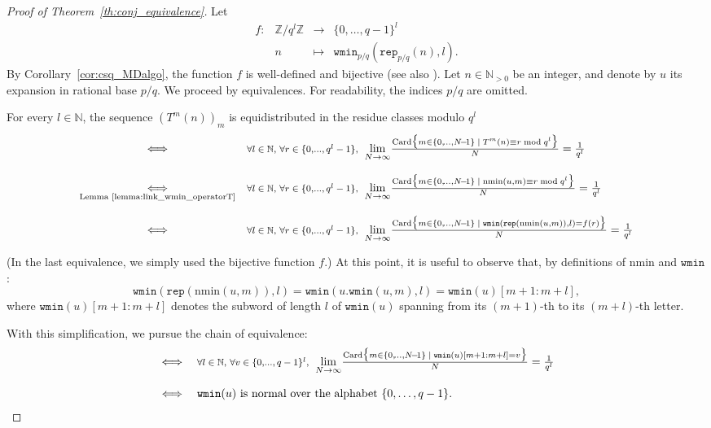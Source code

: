 \documentclass{template_arxiv}
\numberwithin{equation}{section}
\newcommand{\N}{\mathbb N}
\newcommand{\wmin}{\mathtt{wmin}}
\newcommand{\nmin}{\mathrm{nmin}}
\newcommand{\rep}{\mathtt{rep}}
\newcommand{\card}{\mathrm{Card}}
\begin{document}
\begin{proof}[Proof of Theorem~\ref{th:conj_equivalence}] Let
	\[ \begin{array}{llll}
	f : & \mathbb{Z}/q^l\mathbb{Z} & \longrightarrow & \{0,\dots,q-1\}^l \\
	& n & \longmapsto & \wmin_{p/q}(\rep_{p/q}(n),l).
	\end{array}\]
By Corollary~\ref{cor:csq_MDalgo}, the function $f$ is well-defined and bijective (see also \cite[Lemme~4.14]{Mar16}).
	Let $n \in \N_{>0}$ be an integer, and denote by $u$ its expansion in rational base $p/q$.
	We proceed by equivalences. For readability, the indices $p/q$ are omitted.
	
	
	\bigskip
	
	\noindent For every $l\in \N$, the sequence $(T^m(n))_m$ is equidistributed in the residue classes modulo $q^l$ 
	\small
	\[
	\begin{array}{cl}
	\iff & \text{\footnotesize $\forall l\in\N,$ $\forall r \in \{0,\!...,q^l-1\}$, \small } \; \underset{N\to\infty}{\lim}  \frac{\card \big\{m\in \{0,\!...,N\!-\!1\} \;|\; T^m(n) \equiv r \bmod q^l\big\}}{N} = \frac{1}{q^l}\\ \\
	\underset{\text{Lemma~\ref{lemma:link_wmin_operatorT}}}{\iff} & \text{\footnotesize $\forall l\in\N,$ $\forall r \in \{0,\!...,q^l-1\}$, \small } \;\underset{N\to\infty}{\lim} \frac{\card \big\{m\in \{0,\!...,N\!-\!1\} \;|\; \nmin(u,m)\equiv r \bmod q^l\big\}}{N}=\frac{1}{q^l} \\ \\
	{\iff} & \text{\footnotesize $\forall l\in\N,$ $\forall r \in \{0,\!...,q^l-1\}$, \small } \;\underset{N\to\infty}{\lim} \frac{\card \big\{m\in \{0,\!...,N\!-\!1\} \;|\; \wmin(\rep(\nmin(u,m)),l)=f(r)\big\}}{N}=\frac{1}{q^l}
	\end{array}
	\]
	\normalsize
	
	\bigskip
	\noindent (In the last equivalence, we simply used the bijective function $f$.) At this point, it is useful to observe that, by definitions of $\nmin$ and $\wmin$:
	\[
	\wmin(\rep(\nmin(u,m)),l) = \wmin(u.\wmin(u,m),l) = \wmin(u)[m+1:m+l],
	\]
	where $\wmin(u)[m+1:m+l]$ denotes the subword of length $l$ of $\wmin(u)$ spanning from its $(m+1)$-th to its $(m+l)$-th letter.
	
	\bigskip
	With this simplification, we pursue the chain of equivalence:
	\small
	\[
	\begin{array}{cl}
	{\iff} & \text{\footnotesize $\forall l\in\N,$ $\forall v \in \{0,\!...,q-1\}^l$, \small } \;\underset{N\to\infty}{\lim} \frac{\card \big\{m\in \{0,\!...,N\!-\!1\} \;|\; \wmin(u)[m+1:m+l]=v\big\}}{N} = \frac{1}{q^l} \\ \\
	\iff & \text{$\wmin(u)$ is normal over the alphabet $\{0,\dots,q-1\}$.}
	\end{array}
	\]
	\normalsize
	

\end{proof}
\end{document}
